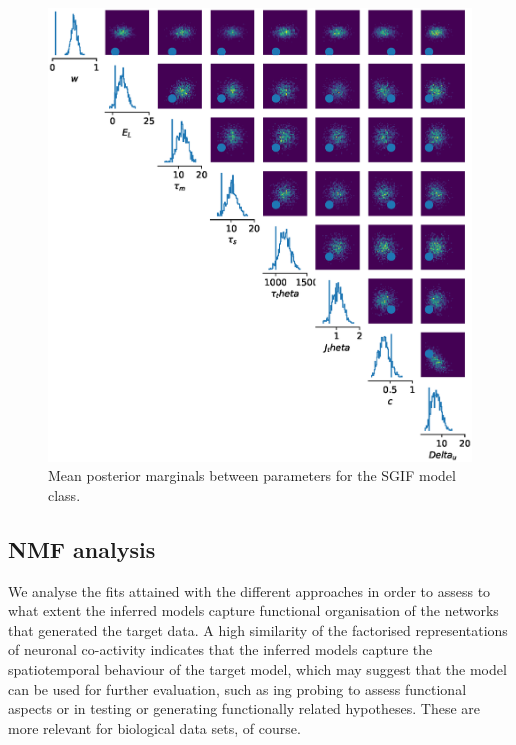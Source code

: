 \documentclass[mphil,deptreport,ianc]{infthesis} %
\begin{document}
\begin{figure}
    \centering
	\includegraphics[width=\columnwidth]{figures/sbi_p_avgs_pairplot_SNPE_microGIF_12-14_16-14-12-736.eps}
	\caption{Mean posterior marginals between parameters for the SGIF model class.}
	\label{fig:mean_posterior_marginal_SNPE_SGIF}
\end{figure}


\clearpage
\subsection{NMF analysis}

We analyse the fits attained with the different approaches in order to assess to what extent the inferred models capture functional organisation of the networks that generated the target data.
A high similarity of the factorised representations of neuronal co-activity indicates that the inferred models capture the spatiotemporal behaviour of the target model, which may suggest that the model can be used for further evaluation, such as ing probing to assess functional aspects or in testing or generating functionally related hypotheses. These are more relevant for biological data sets, of course.
\end{document}
